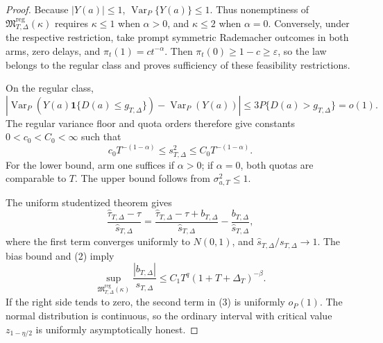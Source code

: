 \documentclass{article}
\begin{document}
\begin{proof}
Because \(|Y(a)|\leq1\), \(\operatorname{Var}_P\{Y(a)\}\leq1\).  Thus nonemptiness of \(\mathfrak M_{T,\Delta}^{\mathrm{reg}}(\kappa)\) requires \(\kappa\leq1\) when \(\alpha>0\), and \(\kappa\leq2\) when \(\alpha=0\).  Conversely, under the respective restriction, take prompt symmetric Rademacher outcomes in both arms, zero delays, and \(\pi_t(1)=ct^{-\alpha}\).  Then \(\pi_t(0)\geq1-c\geq\varepsilon\), so the law belongs to the regular class and proves sufficiency of these feasibility restrictions.

On the regular class,
\[
 |\operatorname{Var}_P(Y(a)\mathbf 1\{D(a)\leq g_{T,\Delta}\})
 -\operatorname{Var}_P(Y(a))|
 \leq3P\{D(a)>g_{T,\Delta}\}=o(1). \tag{1}
\]
The regular variance floor and quota orders therefore give constants \(0<c_0<C_0<\infty\) such that
\[
 c_0T^{-(1-\alpha)}\leq s_{T,\Delta}^2
 \leq C_0T^{-(1-\alpha)}. \tag{2}
\]
For the lower bound, arm one suffices if \(\alpha>0\); if \(\alpha=0\), both quotas are comparable to \(T\).  The upper bound follows from \(\sigma_{a,T}^2\leq1\).

The uniform studentized theorem gives
\[
 \frac{\widehat\tau_{T,\Delta}-\tau}{\widehat s_{T,\Delta}}
 =\frac{\widehat\tau_{T,\Delta}-\tau+b_{T,\Delta}}
 {\widehat s_{T,\Delta}}
 -\frac{b_{T,\Delta}}{\widehat s_{T,\Delta}}, \tag{3}
\]
where the first term converges uniformly to \(N(0,1)\), and \(\widehat s_{T,\Delta}/s_{T,\Delta}\to1\).  The bias bound and (2) imply
\[
 \sup_{\mathfrak M_{T,\Delta}^{\mathrm{reg}}(\kappa)}
 \frac{|b_{T,\Delta}|}{s_{T,\Delta}}
 \leq C_1T^q(1+T+\Delta_T)^{-\beta}. \tag{4}
\]
If the right side tends to zero, the second term in (3) is uniformly \(o_P(1)\).  The normal distribution is continuous, so the ordinary interval with critical value \(z_{1-\eta/2}\) is uniformly asymptotically honest.


\end{proof}
\end{document}

